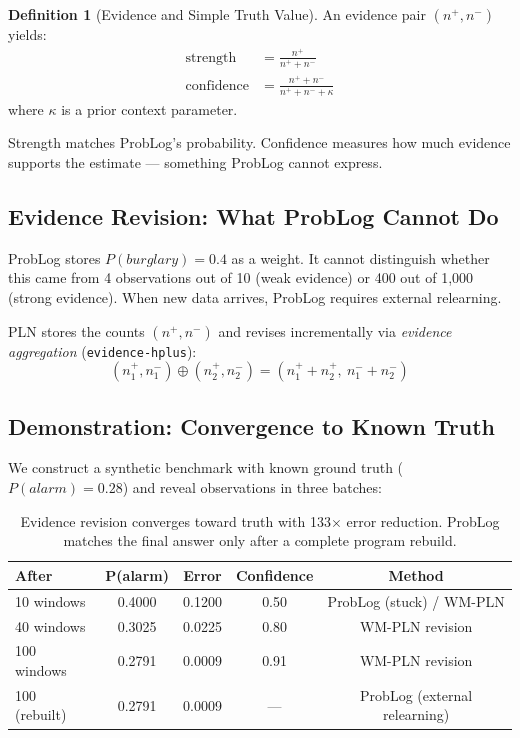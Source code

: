 \documentclass[11pt,a4paper]{article}
\theoremstyle{definition}
\newtheorem{definition}{Definition}[section]
\begin{document}
\begin{definition}[Evidence and Simple Truth Value]
An evidence pair $(n^+, n^-)$ yields:
\begin{align}
\mathrm{strength} &= \frac{n^+}{n^+ + n^-} \\
\mathrm{confidence} &= \frac{n^+ + n^-}{n^+ + n^- + \kappa}
\end{align}
where $\kappa$ is a prior context parameter.
\end{definition}

Strength matches ProbLog's probability. Confidence measures how much
evidence supports the estimate --- something ProbLog cannot express.

\subsection{Evidence Revision: What ProbLog Cannot Do}

ProbLog stores $P(\mathit{burglary}) = 0.4$ as a weight.
It cannot distinguish whether this came from 4 observations out of 10
(weak evidence) or 400 out of 1{,}000 (strong evidence).
When new data arrives, ProbLog requires external relearning.

PLN stores the counts $(n^+, n^-)$ and revises incrementally via
\emph{evidence aggregation} (\texttt{evidence-hplus}):
\[
(n^+_1, n^-_1) \oplus (n^+_2, n^-_2) = (n^+_1 + n^+_2,\ n^-_1 + n^-_2)
\]

\subsection{Demonstration: Convergence to Known Truth}

We construct a synthetic benchmark with known ground truth
($P(\mathit{alarm}) = 0.28$) and reveal observations in three batches:

\begin{table}[h]
\centering
\begin{tabular}{lcccc}
\toprule
\textbf{After} & \textbf{P(alarm)} & \textbf{Error} & \textbf{Confidence} & \textbf{Method} \\
\midrule
10 windows  & 0.4000 & 0.1200 & 0.50 & ProbLog (stuck) / WM-PLN \\
40 windows  & 0.3025 & 0.0225 & 0.80 & WM-PLN revision \\
100 windows & 0.2791 & 0.0009 & 0.91 & WM-PLN revision \\
\midrule
100 (rebuilt) & 0.2791 & 0.0009 & --- & ProbLog (external relearning) \\
\bottomrule
\end{tabular}
\caption{Evidence revision converges toward truth with 133$\times$ error reduction.
ProbLog matches the final answer only after a complete program rebuild.}
\end{table}
\end{document}

